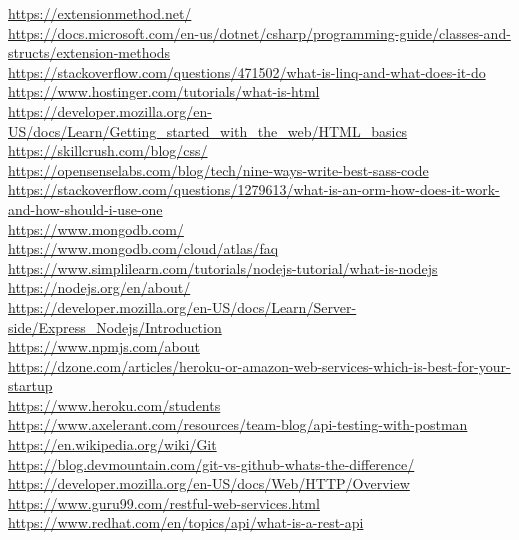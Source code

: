 \url{https://extensionmethod.net/}\\
\url{https://docs.microsoft.com/en-us/dotnet/csharp/programming-guide/classes-and-structs/extension-methods}\\
\url{https://stackoverflow.com/questions/471502/what-is-linq-and-what-does-it-do}\\
\url{https://www.hostinger.com/tutorials/what-is-html}\\
\url{https://developer.mozilla.org/en-US/docs/Learn/Getting\_started\_with\_the\_web/HTML\_basics}\\
\url{https://skillcrush.com/blog/css/}\\
\url{https://opensenselabs.com/blog/tech/nine-ways-write-best-sass-code}\\
\url{https://stackoverflow.com/questions/1279613/what-is-an-orm-how-does-it-work-and-how-should-i-use-one}\\
\url{https://www.mongodb.com/}\\
\url{https://www.mongodb.com/cloud/atlas/faq}\\
\url{https://www.simplilearn.com/tutorials/nodejs-tutorial/what-is-nodejs}\\
\url{https://nodejs.org/en/about/}\\
\url{https://developer.mozilla.org/en-US/docs/Learn/Server-side/Express\_Nodejs/Introduction}\\
\url{https://www.npmjs.com/about}\\
\url{https://dzone.com/articles/heroku-or-amazon-web-services-which-is-best-for-your-startup}\\
\url{https://www.heroku.com/students}\\
\url{https://www.axelerant.com/resources/team-blog/api-testing-with-postman}\\
\url{https://en.wikipedia.org/wiki/Git}\\
\url{https://blog.devmountain.com/git-vs-github-whats-the-difference/}\\
\url{https://developer.mozilla.org/en-US/docs/Web/HTTP/Overview}\\
\url{https://www.guru99.com/restful-web-services.html}\\
\url{https://www.redhat.com/en/topics/api/what-is-a-rest-api}\\

